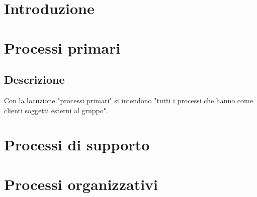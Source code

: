 \documentclass[12pt, oneside]{article}
\begin{document}
\tableofcontents
\newpage
\section{Introduzione}

\newpage

\section{Processi primari}
\subsection{Descrizione}
Con la locuzione "processi primari" si intendono "tutti i processi che hanno come clienti soggetti esterni al gruppo". \\

\newpage

\section{Processi di supporto}


\newpage
\section{Processi organizzativi}

\end{document}
